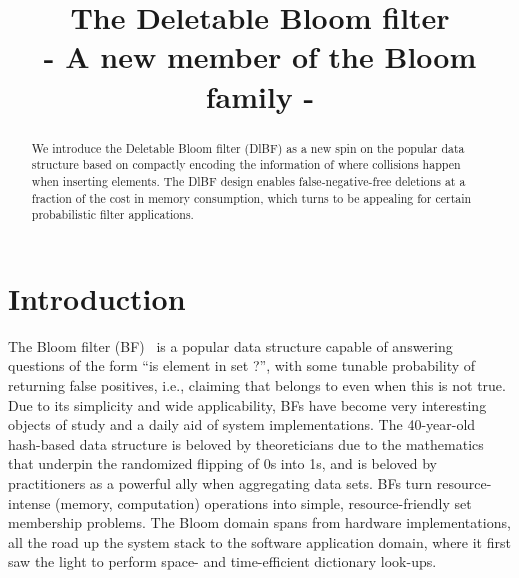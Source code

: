 \documentclass[conference]{IEEEtran}
\begin{document}
\title{The Deletable Bloom filter \\ - A new member of the Bloom family -}


\author{
}



\maketitle





\begin{abstract}
We introduce the Deletable Bloom filter (DlBF) as a new spin on the popular  data structure based on compactly encoding the information of where collisions happen when inserting elements. The DlBF design enables false-negative-free deletions at a fraction of the cost in memory consumption, which turns to be appealing for certain probabilistic filter applications. \end{abstract}







\IEEEpeerreviewmaketitle

\section{Introduction}
The Bloom filter (BF)~\cite{362692} is a popular data structure capable 
of answering questions of the form ``is element  in set ?'', with some tunable probability of returning false positives, i.e., claiming that  belongs to  even when this is not true.
Due to its simplicity and wide applicability, BFs have become very interesting objects of study and a daily aid of system implementations.
The 40-year-old hash-based data structure is beloved by theoreticians due to the mathematics that underpin the randomized flipping of 0s into 1s, and is beloved by practitioners as a powerful ally when aggregating data sets. 
BFs turn resource-intense (memory, computation) operations into simple, resource-friendly set membership problems.
The Bloom domain spans from hardware implementations, 
all the road up the system stack to the software application domain, where it first saw the light
to perform space- and time-efficient dictionary look-ups.
\end{document}
